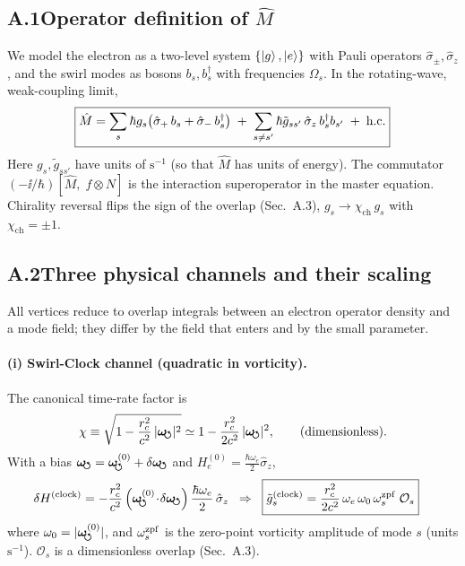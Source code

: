\documentclass[aps,prb,preprint,amsmath,amssymb]{revtex4-2} %
\newcommand{\rc}{r_c}
\newcommand{\omegas}{\boldsymbol{\omega}_{\!\mkern-2mu\scriptstyle\boldsymbol{\circlearrowleft}}} %
\begin{document}
    \subsection*{A.1\quad Operator definition of \texorpdfstring{$\hat M$}{M}}
        We model the electron as a two-level system \(\{\ket{g},\ket{e}\}\) with Pauli operators \(\hat\sigma_\pm,\hat\sigma_z\), and the swirl modes as bosons \(b_s,b_s^\dagger\) with frequencies \(\Omega_s\). In the rotating-wave, weak-coupling limit,
        \begin{align}
            \boxed{%
                \hat M
                = \sum_{s}\hbar g_s\!\left(\hat\sigma_{+}\,b_s+\hat\sigma_{-}\,b_s^\dagger\right)
                \;+\; \sum_{s\neq s'} \hbar \tilde g_{ss'}\,\hat\sigma_z\, b_s^\dagger b_{s'} \;+\; \text{h.c.}
            }
            \label{eq:M-operator}
        \end{align}
        Here \(g_s,\tilde g_{ss'}\) have units of \(\mathrm{s^{-1}}\) (so that \(\hat M\) has units of energy). The commutator \(({-}\ii/\hbar)[\hat M,\;f\!\otimes\!N]\) is the interaction superoperator in the master equation. Chirality reversal flips the sign of the overlap (Sec.~A.3), \(g_s\to \chi_\mathrm{ch}\,g_s\) with \(\chi_\mathrm{ch}=\pm1\).

    \subsection*{A.2\quad Three physical channels and their scaling}
        All vertices reduce to overlap integrals between an electron operator density and a mode field; they differ by the field that enters and by the small parameter.

        \paragraph*{(i) Swirl-Clock channel (quadratic in vorticity).}
            The canonical time-rate factor is
            \begin{align}
                \chi \equiv \sqrt{1-\frac{\rc^{2}}{c^2}\,|\omegas|^2}
                \simeq 1 - \frac{\rc^{2}}{2c^2}\,|\omegas|^2,
                \qquad \text{(dimensionless)} .
            \end{align}
            With a bias \(\omegas=\omegas^{(0)}+\delta\omegas\) and \(H_e^{(0)}=\tfrac{\hbar\omega_e}{2}\hat\sigma_z\),
            \begin{align}
                \delta H^{(\text{clock})} &= -\frac{\rc^2}{c^2}\,\Big(\omegas^{(0)}\!\cdot\!\delta\omegas\Big)\,\frac{\hbar\omega_e}{2}\,\hat\sigma_z
                \;\;\Rightarrow\;\;
                \boxed{%
                    \tilde g_{s}^{(\text{clock})} = \frac{\rc^2}{2c^2}\,\omega_e\,\omega_0\,\omega_{s}^{\rm zpf}\;\mathcal O_s
                }\label{eq:gclock}
            \end{align}
            where \(\omega_0=|\omegas^{(0)}|\), and \(\omega_{s}^{\rm zpf}\) is the zero-point vorticity amplitude of mode \(s\) (units \(\mathrm{s^{-1}}\)). \(\mathcal O_s\) is a dimensionless overlap (Sec.~A.3).
\end{document}
